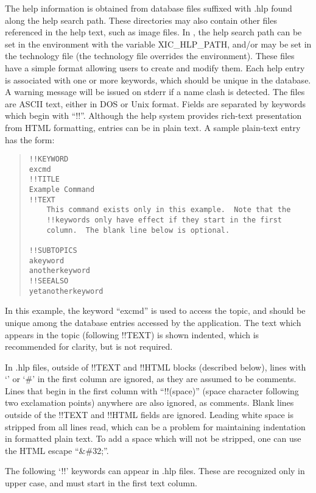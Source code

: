 The help information is obtained from database files suffixed with
{\vt .hlp} found along the help search path.  These directories may
also contain other files referenced in the help text, such as image
files.  In {\Xic}, the help search path can be set in the environment
with the variable {\et XIC\_HLP\_PATH}, and/or may be set in the
technology file (the technology file overrides the environment). 
These files have a simple format allowing users to create and modify
them.  Each help entry is associated with one or more keywords, which
should be unique in the database.  A warning message will be issued on
{\vt stderr} if a name clash is detected.  The files are ASCII text,
either in DOS or Unix format.  Fields are separated by keywords which
begin with ``{\vt !!}''.  Although the help system provides rich-text
presentation from HTML formatting, entries can be in plain text.  A
sample plain-text entry has the form:

\begin{quote}
\begin{verbatim}
!!KEYWORD
excmd
!!TITLE
Example Command
!!TEXT
    This command exists only in this example.  Note that the
    !!keywords only have effect if they start in the first
    column.  The blank line below is optional.

!!SUBTOPICS
akeyword
anotherkeyword
!!SEEALSO
yetanotherkeyword
\end{verbatim}
\end{quote}

In this example, the keyword ``{\vt excmd}'' is used to access the
topic, and should be unique among the database entries accessed by the
application.  The text which appears in the topic (following {\vt
!!TEXT}) is shown indented, which is recommended for clarity, but is
not required.

In {\vt .hlp} files, outside of {\vt !!TEXT} and {\vt !!HTML} blocks
(described below), lines with `{\vt *}' or `{\vt \#}' in the first
column are ignored, as they are assumed to be comments.  Lines that
begin in the first column with ``{\vt !!}(space)'' (space character
following two exclamation points) anywhere are also ignored, as
comments.  Blank lines outside of the {\vt !!TEXT} and {\vt !!HTML}
fields are ignored.  Leading white space is stripped from all lines
read, which can be a problem for maintaining indentation in formatted
plain text.  To add a space which will not be stripped, one can use
the HTML escape ``{\vt \&\#32;}''.

The following `{\vt !!}' keywords can appear in {\vt .hlp} files. 
These are recognized only in upper case, and must start in the first
text column.

